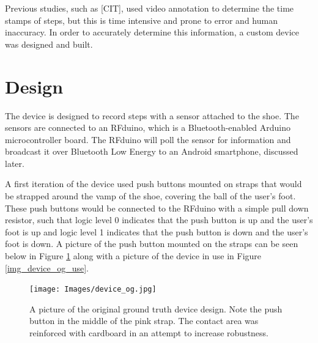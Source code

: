         Previous studies, such as [CIT], used video annotation to determine the time stamps of steps, but this is time intensive and prone to error and human inaccuracy. In order to accurately determine this information, a custom device was designed and built.

        \section{Design}

            The device is designed to record steps with a sensor attached to the shoe. The sensors are connected to an RFduino, which is a Bluetooth-enabled Arduino microcontroller board. The RFduino will poll the sensor for information and broadcast it over Bluetooth Low Energy to an Android smartphone, discussed later. 

            A first iteration of the device used push buttons mounted on straps that would be strapped around the vamp of the shoe, covering the ball of the user's foot. These push buttons would be connected to the RFduino with a simple pull down resistor, such that logic level 0 indicates that the push button is up and the user's foot is up and logic level 1 indicates that the push button is down and the user's foot is down. A picture of the push button mounted on the straps can be seen below in Figure \ref{img_device_og} along with a picture of the device in use in Figure \ref{img_device_og_use}.

            \begin{figure}[!th]
                \texttt{[image: Images/device\_og.jpg]}
                \centering
                \caption{A picture of the original ground truth device design. Note the push button in the middle of the pink strap. The contact area was reinforced with cardboard in an attempt to increase robustness.}
                \label{img_device_og}
            \end{figure}

